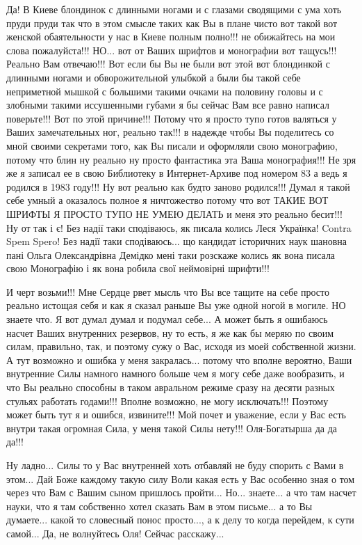 Да! В Киеве блондинок с длинными ногами и с глазами
сводящими с ума хоть пруди пруди так что в этом смысле таких как Вы в плане
чисто вот такой вот женской обаятельности у нас в Киеве полным полно!!!  не
обижайтесь на мои слова пожалуйста!!! НО... вот от Ваших шрифтов и монографии
вот тащусь!!!  Реально Вам отвечаю!!! Вот если бы Вы не были вот этой вот
блондинкой с длинными ногами и обворожительной улыбкой а были бы такой себе
неприметной мышкой с большими такими очками на половину головы и с злобными
такими иссушенными губами я бы сейчас Вам все равно написал поверьте!!! Вот по
этой причине!!! Потому что я просто тупо готов валяться у Ваших замечательных ног, реально
так!!!  в надежде чтобы Вы поделитесь со мной своими секретами того, как Вы
писали и оформляли свою монографию, потому что блин ну реально ну просто
фантастика эта Ваша монография!!!  Не зря же я записал ее в свою Библиотеку в
Интернет-Архиве под номером 83 а ведь я родился в 1983 году!!!  Ну вот реально
как будто заново родился!!! Думал я такой себе умный а оказалось полное я
ничтожество потому что вот ТАКИЕ ВОТ ШРИФТЫ Я ПРОСТО ТУПО НЕ УМЕЮ ДЕЛАТЬ и меня
это реально бесит!!! Ну от так і є! Без надії таки сподіваюсь, як писала колись
Леся Українка!  Contra Spem Spero! Без надії таки сподіваюсь... що кандидат
історичних наук шановна пані Ольга Олександрівна Демідко мені таки розскаже
колись як вона писала свою Монографію і як вона робила свої неймовірні
шрифти!!!

И черт возьми!!! Мне Сердце рвет мысль что Вы все тащите на себе просто реально
истощая себя и как я сказал раньше Вы уже одной ногой в могиле.  НО знаете что.
Я вот думал думал и подумал себе... А может быть я ошибаюсь насчет Ваших
внутренних резервов, ну то есть, я же как бы меряю по своим силам, правильно,
так, и поэтому сужу о Вас, исходя из моей собственной жизни. А тут возможно и
ошибка у меня закралась... потому что вполне вероятно, Ваши внутренние Силы
намного намного больше чем я могу себе даже вообразить, и что Вы реально
способны в таком авральном режиме сразу на десяти разных стульях работать
годами!!! Вполне возможно, не могу исключать!!!  Поэтому может быть тут я и
ошибся, извините!!! Мой почет и уважение, если у Вас есть внутри такая огромная
Сила, у меня такой Силы нету!!! Оля-Богатырша да да да!!!

Ну ладно... Силы то у Вас внутренней хоть отбавляй не буду спорить с Вами в этом...
Дай Боже каждому такую силу Воли какая есть у Вас особенно зная о том через что Вам с Вашим сыном
пришлось пройти... Но... знаете... а что там насчет науки, что я там собственно хотел сказать Вам в этом письме...
а то Вы думаете... какой то словесный понос просто..., а к делу то когда перейдем, к сути самой...
Да, не волнуйтесь Оля! Сейчас расскажу...

